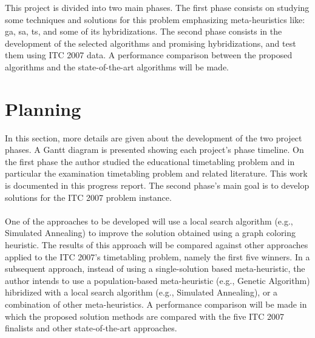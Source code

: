 This project is divided into two main phases. The first phase consists on studying some techniques and solutions for this problem emphasizing meta-heuristics like: \gls{ga}, \gls{sa}, \gls{ts}, and some of its hybridizations. The second phase consists in the development of the selected algorithms and promising hybridizations, and test them using ITC 2007 data. A performance comparison between the proposed algorithms and the state-of-the-art algorithms will be made.


\section{Planning}

In this section, more details are given about the development of the two project phases. A Gantt diagram is presented showing each project's phase timeline. On the first phase the author studied the educational timetabling problem and in particular the examination timetabling problem and related literature. This work is documented in this progress report. The second phase's main goal is to develop solutions for the ITC 2007 problem instance. \\
\\
One of the approaches to be developed will use a local search algorithm (e.g., Simulated Annealing) to improve the solution obtained using a graph coloring heuristic. The results of this approach will be compared against other approaches applied to the ITC 2007’s timetabling problem, namely the first five winners. In a subsequent approach, instead of using a single-solution based meta-heuristic, the author intends to use a population-based meta-heuristic (e.g., Genetic Algorithm) hibridized with a local
search algorithm (e.g., Simulated Annealing), or a combination of other meta-heuristics. A performance comparison will be made in which the proposed solution methods are compared with the five ITC 2007 finalists and other state-of-the-art approaches. 

